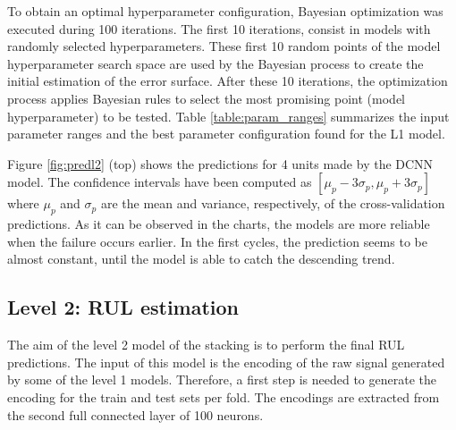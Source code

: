 \documentclass[PHM, 2021]{PHMSociety}
\begin{document}
To obtain an optimal hyperparameter configuration, Bayesian optimization was executed during 100 iterations. The first 10 iterations, consist in models with randomly selected hyperparameters. These first 10 random points of the model hyperparameter search space are used by the Bayesian process to create the initial estimation of the error surface. After these 10 iterations, the optimization process applies Bayesian rules to select the most promising point (model hyperparameter) to be tested. Table \ref{table:param_ranges} summarizes the input parameter ranges and the best parameter configuration found for the  L1 model.


Figure \ref{fig:predl2} (top) shows the predictions for 4 units made by the DCNN  model. The confidence intervals have been computed as $[\mu_p - 3\sigma_p, \mu_p + 3\sigma_p]$ where $\mu_p$ and $\sigma_p$ are the mean and variance, respectively, of the cross-validation predictions. As it can be observed in the charts, the models are more reliable when the failure occurs earlier. In the first cycles, the prediction seems to be almost constant, until the model is able to catch the descending trend. 


\subsection{Level 2: RUL estimation}







The aim of the level 2 model of the stacking is to perform the final RUL predictions. The input of this model is the encoding of the raw signal generated by some of the level 1 models. Therefore, a first step is needed to generate the encoding for the train and test sets per fold. The encodings are extracted from the second full connected layer of 100 neurons. 
\end{document}
